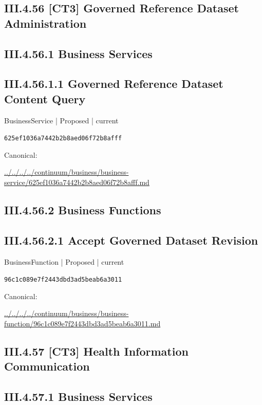 \documentclass[10pt,a4paper]{article}
\begin{document}
\subsection*{III.4.56 [CT3] Governed Reference Dataset Administration}
\subsection*{III.4.56.1 Business Services}
\subsection*{III.4.56.1.1 Governed Reference Dataset Content Query}
{\small BusinessService | Proposed | current}\par
\texttt{625ef1036a7442b2b8aed06f72b8afff}\par
Canonical: \par
{\footnotesize\url{../../../../continuum/business/business-service/625ef1036a7442b2b8aed06f72b8afff.md}}\par
\subsection*{III.4.56.2 Business Functions}
\subsection*{III.4.56.2.1 Accept Governed Dataset Revision}
{\small BusinessFunction | Proposed | current}\par
\texttt{96c1c089e7f2443dbd3ad5beab6a3011}\par
Canonical: \par
{\footnotesize\url{../../../../continuum/business/business-function/96c1c089e7f2443dbd3ad5beab6a3011.md}}\par
\subsection*{III.4.57 [CT3] Health Information Communication}
\subsection*{III.4.57.1 Business Services}
\end{document}
